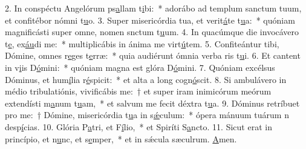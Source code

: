 2. In conspéctu Angelórum ps\uline{a}llam t\uline{i}bi:~* adorábo ad templum sanctum tuum, et confitébor nómni t\uline{u}o.
3. Super misericórdia tua, et verit\uline{á}te t\uline{u}a:~* quóniam magnificásti super omne, nomen snctum t\uline{u}um.
4. In quacúmque die invocávero t\uline{e}, ex\uline{áu}di me:~* multiplicábis in ánima me virt\uline{ú}tem.
5. Confiteántur tibi, Dómine, omnes r\uline{e}ges t\uline{e}rræ:~* quia audiérunt ómnia verba ris t\uline{u}i.
6. Et cantent in v\uline{i}is D\uline{ó}mini:~* quóniam magna est glóra D\uline{ó}mini.
7. Quóniam excélsus Dóminus, et hum\uline{í}lia r\uline{é}spicit:~* et alta a long cogn\uline{ó}scit.
8. Si ambulávero in médio tribulatiónis, vivificábis me:~† et super iram inimicórum meórum extendísti m\uline{a}num t\uline{u}am,~* et salvum me fecit déxtra t\uline{u}a.
9. Dóminus retríbuet pro me:~† Dómine, misericórdia t\uline{u}a in s\uline{ǽ}culum:~* ópera mánuum tuárum n desp\uline{í}cias.
10. Glória P\uline{a}tri, et F\uline{í}lio,~* et Spiríti S\uline{a}ncto.
11. Sicut erat in princípio, et n\uline{u}nc, et s\uline{e}mper,~* et in sǽcula sæculrum. \uline{A}men.

